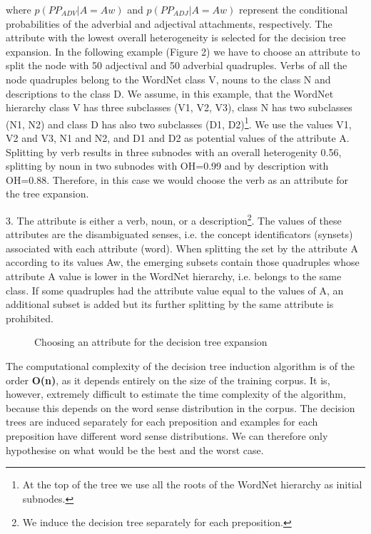 \noindent
where $p(PP_{ADV}|A=Aw)$ and $p(PP_{ADJ}|A=Aw)$ represent the conditional probabilities of the adverbial and adjectival attachments, respectively. The attribute with the lowest overall heterogeneity is selected for the decision tree expansion. In the following example (Figure 2) we have to choose an attribute to split the node with 50 adjectival and 50 adverbial quadruples. Verbs of all the node quadruples belong to the WordNet class V, nouns to the class N and descriptions to the class D. We assume, in this example, that the WordNet hierarchy class V has three subclasses (V1, V2, V3), class N has two subclasses (N1, N2) and class D has also two subclasses (D1, D2)\footnote{At the top of the tree we use all the roots of the WordNet hierarchy as initial subnodes.}. We use the values V1, V2 and V3, N1 and N2, and D1 and D2 as potential values of the attribute A. Splitting by verb results in three subnodes with an overall heterogenity 0.56, splitting by noun in two subnodes with OH=0.99 and by description with OH=0.88. Therefore, in this case we would choose the verb as an attribute for the tree expansion.

3. The attribute is either a verb, noun, or a description\footnote{We induce the decision tree separately for each preposition.}. The values of these attributes are the disambiguated senses, i.e. the concept identificators (synsets) associated with each attribute (word). When splitting the set by the attribute A according to its values Aw, the emerging subsets contain those quadruples whose attribute A value is lower in the WordNet hierarchy, i.e. belongs to the same class. If some quadruples had the attribute value equal to the values of A, an additional subset is added but its further splitting by the same attribute is prohibited.

\begin{figure}[t]
  \leavevmode
  \begin{center}
	
    \caption{Choosing an attribute for the decision tree expansion}
    \label{fig:2}
  \end{center}
\end{figure}

The computational complexity of the decision tree induction algorithm is of the order {\bf O(n)}, as it depends entirely on the size of the training corpus. It is, however, extremely difficult to estimate the time complexity of the algorithm, because this depends on the word sense distribution in the corpus. The decision trees are induced separately for each preposition and examples for each preposition have different word sense distributions. We can therefore only hypothesise on what would be the best and the worst case.

